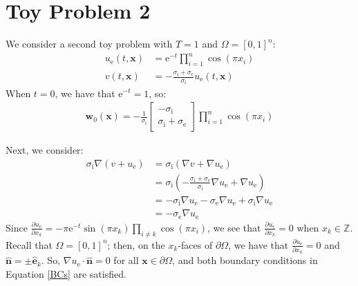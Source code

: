 \documentclass{article}
\newcommand{\bvec}[1]{\boldsymbol{#1}}
\newcommand{\brvec}[1]{\mathbf{#1}}
\newcommand{\ee}{\mathrm{e}}
\begin{document}
\newpage

\section{Toy Problem 2}

We consider a second toy problem with $T = 1$ and $\Omega = [0, 1]^n$:
\begin{align*}
    u_\text{e}(t, \bvec{x}) & = \ee^{-t} \prod_{i = 1}^n \cos(\pi x_i) \\
    v(t, \bvec{x}) & = -\frac{\sigma_\text{i} + \sigma_\text{e}}{\sigma_\text{i}} u_\text{e}(t, \bvec{x})
\end{align*}
\noindent When $t = 0$, we have that $\ee^{-t} = 1$, so:
\begin{align*}
    \bvec{w}_0(\bvec{x}) = -\frac{1}{\sigma_\text{i}} \begin{bmatrix}
        -\sigma_\text{i} \\
        \sigma_\text{i} + \sigma_\text{e}
    \end{bmatrix} \prod_{i = 1}^n \cos(\pi x_i)
\end{align*}

Next, we consider:
\begin{align*}
    \sigma_\text{i} \nabla (v + u_\text{e}) & = \sigma_\text{i} (\nabla v + \nabla u_\text{e}) \\
        & = \sigma_\text{i} (-\frac{\sigma_\text{i} + \sigma_\text{e}}{\sigma_\text{i}} \nabla u_\text{e}
            + \nabla u_\text{e}) \\
        & = -\sigma_\text{i} \nabla u_\text{e} - \sigma_\text{e} \nabla u_\text{e} + \sigma_\text{i} \nabla u_\text{e} \\
        & = -\sigma_\text{e} \nabla u_\text{e}
\end{align*}
\noindent Since $\frac{\partial u_\text{e}}{\partial x_k} = -\pi \ee^{-t} \sin(\pi x_k) \prod_{i \neq k} \cos(\pi x_i)$,
we see that $\frac{\partial u_\text{e}}{\partial x_k} = 0$ when $x_k \in \mathbb{Z}$.
Recall that $\Omega = [0, 1]^n$; then, on the $x_k$-faces of $\partial \Omega$,
we have that $\frac{\partial u_\text{e}}{\partial x_k} = 0$
and $\hat{\brvec{n}} = \pm \hat{\brvec{e}}_k$.
So, $\nabla u_\text{e} \cdot \hat{\brvec{n}} = 0$ for all $\bvec{x} \in \partial \Omega$,
and both boundary conditions in Equation \ref{BCs} are satisfied.
\end{document}
